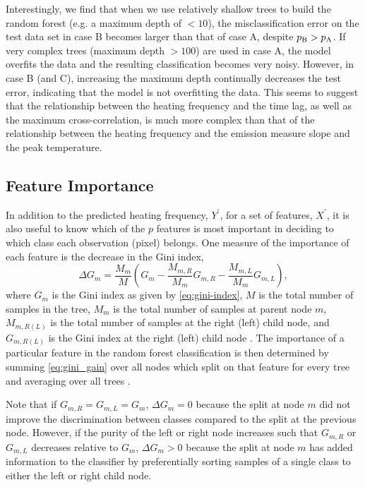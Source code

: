 Interestingly, we find that when we use relatively shallow trees to build the random forest (e.g. a maximum depth of $<10$), the misclassification error on the test data set in case B becomes larger than that of case A, despite $p_\textup{B}>p_\textup{A}$.
If very complex trees (maximum depth $>100$) are used in case A, the model overfits the data and the resulting classification becomes very noisy. 
However, in case B (and C), increasing the maximum depth continually decreases the test error, indicating that the model is not overfitting the data. 
This seems to suggest that the relationship between the heating frequency and the time lag, as well as the maximum cross-correlation, is much more complex than that of the relationship between the heating frequency and the emission measure slope and the peak temperature.

\subsection{Feature Importance}\label{sec:feature-importance}

In addition to the predicted heating frequency, $Y^\prime$, for a set of features, $X^\prime$, it is also useful to know which of the $p$ features is most important in deciding to which class each observation (pixel) belongs.
One measure of the importance of each feature is the decrease in the Gini index,
\begin{equation}\label{eq:gini_gain}
    \Delta G_m = \frac{M_m}{M}\left( G_m - \frac{M_{m,R}}{M_m}G_{m,R} - \frac{M_{m,L}}{M_m}G_{m,L} \right),
\end{equation}
where $G_m$ is the Gini index as given by \autoref{eq:gini-index}, $M$ is the total number of samples in the tree, $M_m$ is the total number of samples at parent node $m$, $M_{m,R(L)}$ is the total number of samples at the right (left) child node, and $G_{m,R(L)}$ is the Gini index at the right (left) child node \citep{sandri_bias_2008}.
The importance of a particular feature in the random forest classification is then determined by summing \autoref{eq:gini_gain} over all nodes which split on that feature for every tree and averaging over all trees \citep{breiman_classification_1984}.

Note that if $G_{m,R}=G_{m,L}=G_m$, $\Delta G_m=0$ because the split at node $m$ did not improve the discrimination between classes compared to the split at the previous node.
However, if the purity of the left or right node increases such that $G_{m,R}$ or $G_{m,L}$ decreases relative to $G_m$, $\Delta G_m > 0$ because the split at node $m$ has added information to the classifier by preferentially sorting samples of a single class to either the left or right child node.

